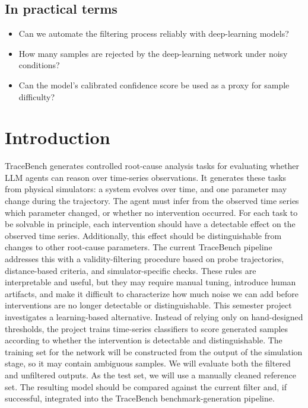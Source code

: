 \documentclass[11pt]{article}
\begin{document}
\subsection*{In practical terms}

\begin{itemize}
    \item Can we automate the \name{} filtering process reliably with deep-learning models?
    \item How many samples are rejected by the deep-learning network under noisy conditions?
    \item Can the model’s calibrated confidence score be used as a proxy for sample difficulty?
\end{itemize}

\section*{Introduction}
TraceBench generates controlled root-cause analysis tasks for evaluating whether LLM agents can reason over time-series observations.
It generates these tasks from physical simulators: a system evolves over time, and one parameter may change during the trajectory. 
The agent must infer from the observed time series which parameter changed, or whether no intervention occurred.
For each task to be solvable in principle, each intervention should have a detectable effect on the observed time series. 
Additionally, this effect should be distinguishable from changes to other root-cause parameters.
The current TraceBench pipeline addresses this with a validity-filtering procedure based on probe trajectories, distance-based criteria, and simulator-specific checks.
These rules are interpretable and useful, but they may require manual tuning, introduce human artifacts, and make it difficult to characterize how much noise we can add before interventions are no longer detectable or distinguishable.
This semester project investigates a learning-based alternative. 
Instead of relying only on hand-designed thresholds, the project trains time-series classifiers to score generated samples according to whether the intervention is detectable and distinguishable. 
The training set for the network will be constructed from the output of the \name{} simulation stage, so it may contain ambiguous samples.
We will evaluate both the filtered and unfiltered outputs.
As the test set, we will use a manually cleaned reference set.
The resulting model should be compared against the current filter and, if successful, integrated into the TraceBench benchmark-generation pipeline.
\end{document}
